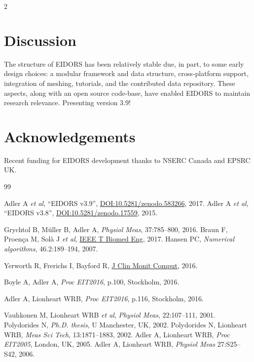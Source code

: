 \documentclass[10pt,letterpaper]{article}
\renewenvironment{thebibliography}[1]{%
    \begin{oldthebibliography}{#1}%
      \setlength{\parskip}{0ex}%
      \setlength{\itemsep}{0ex}%
  }%
  {%
    \end{oldthebibliography}%
  }
\begin{document}
\begin{multicols}{2}
\section{Discussion}
The structure of EIDORS has been relatively stable due, in part, to some early design choices:
a modular framework and data structure,
cross-platform support, integration of meshing,
tutorials, and the contributed data repository.
These aspects, along with an open source code-base, have enabled EIDORS to
maintain research relevance.
Presenting version 3.9!


\section*{Acknowledgements}
Recent funding for EIDORS development thanks to
NSERC Canada and EPSRC UK.

\footnotesize
\begin{thebibliography}{99}
   Adler A {\em et al}, ``EIDORS v3.9'',
   \href{http://dx.doi.org/10.5281/zenodo.583266}{DOI:10.5281/zenodo.583266},
    2017.
   Adler A {\em et al}, ``EIDORS v3.8'',
   \href{http://dx.doi.org/10.5281/zenodo.17559}{DOI:10.5281/zenodo.17559},
    2015.

   Grychtol B, Müller B, Adler A,
   {\em Physiol Meas}, 37:785--800, 2016.
   Braun F, Proença M, Solà J {\em et al}, \href{http://dx.doi.org/10.1109/TBME.2017.2659540}{IEEE T Biomed Eng}, 2017.
   Hansen PC, {\em Numerical algorithms}, 46.2:189--194, 2007.

Yerworth R, Frerichs I, Bayford R, \href{http://dx.doi.org/10.1007/s10877-016-9920-y}{J Clin Monit Comput}, 2016.

Boyle A, Adler A,
{\em Proc EIT2016}, p.100, Stockholm,  2016.

Adler A, Lionheart WRB, 
{\em Proc EIT2016}, p.116, Stockholm,  2016.

   Vauhkonen M, Lionheart WRB {\em  et al},
   {\em  Physiol Meas}, 22:107--111, 2001.
   Polydorides N,
 {\em Ph.D. thesis}, U Manchester, UK, 2002.
   Polydorides N, Lionheart WRB,
   {\em Meas Sci Tech}, 13:1871--1883, 2002.
Adler A, Lionheart WRB,
{\em Proc EIT2005}, London, UK, 2005.
%
Adler A, Lionheart WRB,
{\em Physiol Meas} 27:S25--S42, 2006.


\end{thebibliography}
\end{multicols}
\end{document}
